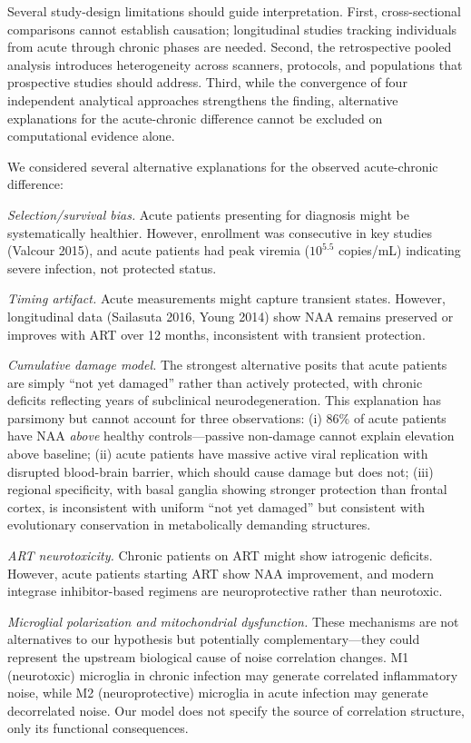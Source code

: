 \documentclass[10pt,a4paper]{article}
\begin{document}
Several study-design limitations should guide interpretation. First, cross-sectional comparisons cannot establish causation; longitudinal studies tracking individuals from acute through chronic phases are needed. Second, the retrospective pooled analysis introduces heterogeneity across scanners, protocols, and populations that prospective studies should address. Third, while the convergence of four independent analytical approaches strengthens the finding, alternative explanations for the acute-chronic difference cannot be excluded on computational evidence alone.

We considered several alternative explanations for the observed acute-chronic difference:

\textit{Selection/survival bias.} Acute patients presenting for diagnosis might be systematically healthier. However, enrollment was consecutive in key studies (Valcour 2015), and acute patients had peak viremia ($10^{5.5}$ copies/mL) indicating severe infection, not protected status.

\textit{Timing artifact.} Acute measurements might capture transient states. However, longitudinal data (Sailasuta 2016, Young 2014) show NAA remains preserved or improves with ART over 12 months, inconsistent with transient protection.

\textit{Cumulative damage model.} The strongest alternative posits that acute patients are simply ``not yet damaged'' rather than actively protected, with chronic deficits reflecting years of subclinical neurodegeneration. This explanation has parsimony but cannot account for three observations: (i) 86\% of acute patients have NAA \textit{above} healthy controls---passive non-damage cannot explain elevation above baseline; (ii) acute patients have massive active viral replication with disrupted blood-brain barrier, which should cause damage but does not; (iii) regional specificity, with basal ganglia showing stronger protection than frontal cortex, is inconsistent with uniform ``not yet damaged'' but consistent with evolutionary conservation in metabolically demanding structures.

\textit{ART neurotoxicity.} Chronic patients on ART might show iatrogenic deficits. However, acute patients starting ART show NAA improvement, and modern integrase inhibitor-based regimens are neuroprotective rather than neurotoxic.

\textit{Microglial polarization and mitochondrial dysfunction.} These mechanisms are not alternatives to our hypothesis but potentially complementary---they could represent the upstream biological cause of noise correlation changes. M1 (neurotoxic) microglia in chronic infection may generate correlated inflammatory noise, while M2 (neuroprotective) microglia in acute infection may generate decorrelated noise. Our model does not specify the source of correlation structure, only its functional consequences.
\end{document}
